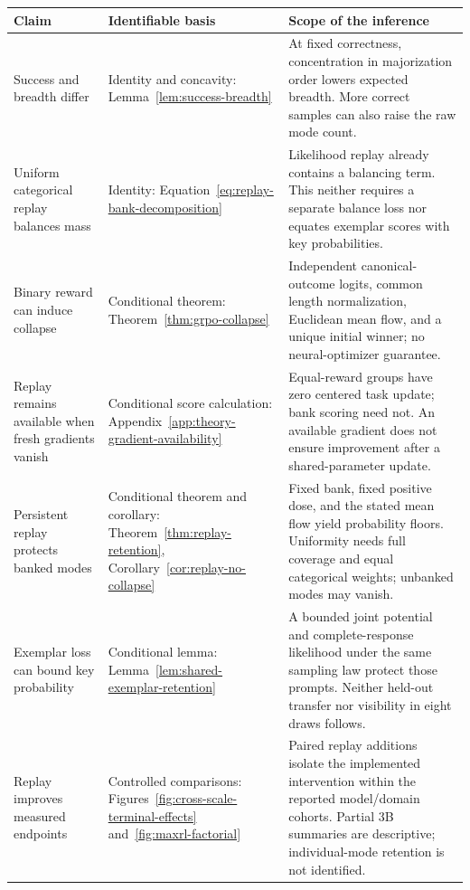 \documentclass{article}
\newcommand{\1}{\mathbf 1}
\theoremstyle{remark}
\theoremstyle{definition}
\theoremstyle{plain}
\begin{document}
\begin{table}[H]
\centering
\small
\setlength{\tabcolsep}{5pt}
\renewcommand{\arraystretch}{1.16}
\begin{tabularx}{\linewidth}{@{}p{.21\linewidth}p{.22\linewidth}X@{}}
\toprule
\textbf{Claim} & \textbf{Identifiable basis} & \textbf{Scope of the inference} \\
\midrule
Success and breadth differ & Identity and concavity: Lemma~\ref{lem:success-breadth} &
At fixed correctness, concentration in majorization order lowers expected breadth.
More correct samples can also raise the raw mode count. \\
Uniform categorical replay balances mass & Identity: Equation~\eqref{eq:replay-bank-decomposition} &
Likelihood replay already contains a balancing term. This neither requires a
separate balance loss nor equates exemplar scores with key probabilities. \\
Binary reward can induce collapse & Conditional theorem: Theorem~\ref{thm:grpo-collapse} &
Independent canonical-outcome logits, common length normalization, Euclidean
mean flow, and a unique initial winner; no neural-optimizer guarantee. \\
Replay remains available when fresh gradients vanish & Conditional score calculation:
Appendix~\ref{app:theory-gradient-availability} &
Equal-reward groups have zero centered task update; bank scoring need not.
An available gradient does not ensure improvement after a shared-parameter update. \\
Persistent replay protects banked modes & Conditional theorem and corollary:
Theorem~\ref{thm:replay-retention}, Corollary~\ref{cor:replay-no-collapse} &
Fixed bank, fixed positive dose, and the stated mean flow yield probability
floors. Uniformity needs full coverage and equal categorical weights;
unbanked modes may vanish. \\
Exemplar loss can bound key probability & Conditional lemma:
Lemma~\ref{lem:shared-exemplar-retention} &
A bounded joint potential and complete-response likelihood under the same
sampling law protect those prompts. Neither held-out transfer nor visibility
in eight draws follows. \\
Replay improves measured endpoints & Controlled comparisons:
Figures~\ref{fig:cross-scale-terminal-effects} and~\ref{fig:maxrl-factorial} &
Paired replay additions isolate the implemented intervention within the
reported model/domain cohorts. Partial 3B summaries are descriptive;
individual-mode retention is not identified. \\

\end{tabularx}
\end{table}
\end{document}
